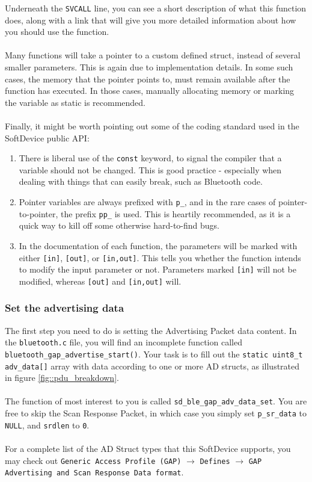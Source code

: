 \documentclass[11pt,a4paper]{article}
\begin{document}
\noindent
Underneath the \texttt{SVCALL} line, you can see a short description of what this function does, along with a link that will give you more detailed information about how you should use the function.\\
\\
Many functions will take a pointer to a custom defined struct, instead of several smaller parameters. This is again due to implementation details. In some such cases, the memory that the pointer points to, must remain available after the function has executed. In those cases, manually allocating memory or marking the variable as static is recommended.\\
\\
Finally, it might be worth pointing out some of the coding standard used in the SoftDevice public API:
\begin{enumerate}
\item There is liberal use of the \texttt{const} keyword, to signal the compiler that a variable should not be changed. This is good practice - especially when dealing with things that can easily break, such as Bluetooth code.
\item Pointer variables are always prefixed with \texttt{p_}, and in the rare cases of pointer-to-pointer, the prefix \texttt{pp_} is used. This is heartily recommended, as it is a quick way to kill off some otherwise hard-to-find bugs.
\item In the documentation of each function, the parameters will be marked with either \texttt{[in]}, \texttt{[out]}, or \texttt{[in,out]}. This tells you whether the function intends to modify the input parameter or not. Parameters marked \texttt{[in]} will not be modified, whereas \texttt{[out]} and \texttt{[in,out]} will.
\end{enumerate}

\subsubsection{Set the advertising data}
The first step you need to do is setting the Advertising Packet data content. In the \texttt{bluetooth.c} file, you will find an incomplete function called \texttt{bluetooth_gap_advertise_start()}. Your task is to fill out the \texttt{static uint8_t adv_data[]} array with data according to one or more AD structs, as illustrated in figure \ref{fig::pdu_breakdown}.\\
\\
The function of most interest to you is called \texttt{sd_ble_gap_adv_data_set}. You are free to skip the Scan Response Packet, in which case you simply set \texttt{p_sr_data} to \texttt{NULL}, and \texttt{srdlen} to \texttt{0}.\\
\\
For a complete list of the AD Struct types that this SoftDevice supports, you may check out \texttt{Generic Access Profile (GAP)} $\rightarrow$ \texttt{Defines} $\rightarrow$ \texttt{GAP Advertising and Scan Response Data format}.
\end{document}
